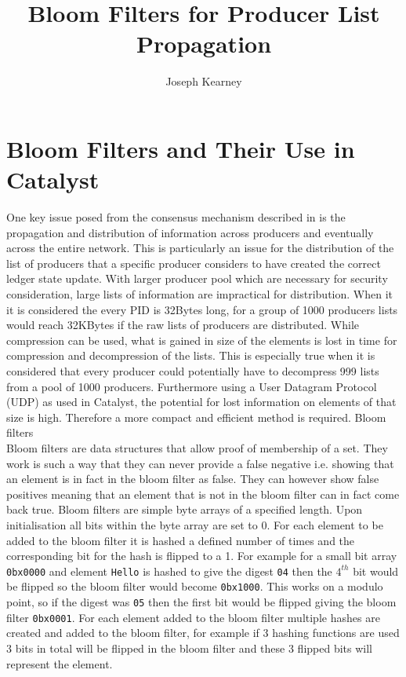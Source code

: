 \documentclass{article}
\title{Bloom Filters for Producer List Propagation}
\author{Joseph Kearney}
\begin{document}
\maketitle

\section{Bloom Filters and Their Use in Catalyst}

One key issue posed from the consensus mechanism described in \cite{TWP} is the propagation and distribution of information across producers and eventually across the entire network. This is particularly an issue for the distribution of the list of producers   that a specific producer considers to have created the correct ledger state update. With larger producer pool which are necessary for security consideration, large lists of information are impractical for distribution. When it it is considered the every PID is 32Bytes long, for a group of 1000 producers lists would reach 32KBytes if the raw lists of producers are distributed. While compression can be used, what is gained in size of the elements is lost in time for compression and decompression of the lists. This is especially true when it is considered that every producer could potentially have to decompress 999 lists from a pool of 1000 producers. Furthermore using a User Datagram Protocol (UDP) as used in Catalyst, the potential for lost information on elements of that size is high. Therefore a more compact and efficient method is required. Bloom filters \\

Bloom filters are data structures that allow proof of membership of a set. They work is such a way that they can never provide a false negative i.e. showing that an element is in fact in the bloom filter as false. They can however show false positives meaning that an element that is not in the bloom filter can in fact come back true. Bloom filters are simple byte arrays of a specified length. Upon initialisation all bits within the byte array are set to 0. For each element to be added to the bloom filter it is hashed a defined number of times and the corresponding bit for the hash is flipped to a 1. For example for a small bit array \verb'0bx0000' and element \verb'Hello' is hashed to give the digest \verb'04' then the $4^{th}$ bit would be flipped so the bloom filter would become \verb'0bx1000'. This works on a modulo point, so if the digest was \verb'05' then the first bit would be flipped giving the bloom filter \verb'0bx0001'. For each element added to the bloom filter multiple hashes are created and added to the bloom filter, for example if 3 hashing functions are used 3 bits in total will be flipped in the bloom filter and these 3 flipped bits will represent the element. \\
\end{document}
